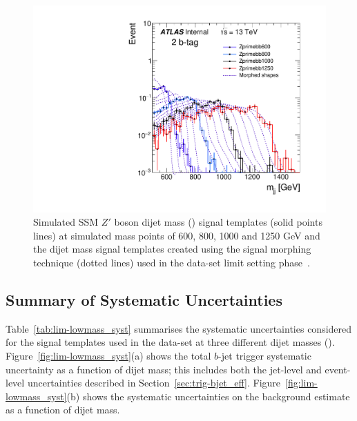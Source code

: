 \begin{figure}[!ht]
\begin{center}
  \includegraphics[width=0.5\linewidth, angle=0]{figs/Dibjet/LowMass/lim-morphing.pdf} 
\end{center}
\caption[Simulated SSM $Z'$ boson dijet mass (\mjj) signal templates and the intermediate dijet mass signal templates
  created using the signal morphing technique used in the \lm{} data-set limit setting phase.]
        {Simulated SSM $Z'$ boson dijet mass (\mjj) signal templates (solid points lines)
          at simulated mass points of 600, 800, 1000 and 1250 GeV 
          and the dijet mass signal templates created using the signal morphing technique (dotted lines) used in the \lm{} data-set limit setting phase~\cite{dibjet-full_int}.
          \label{fig:lim-full_morphing}}
\end{figure}




\subsection{Summary of Systematic Uncertainties}
\label{sec:lim-full_systs}

Table~\ref{tab:lim-lowmass_syst} summarises the systematic uncertainties considered for the
signal templates used in the \lm{} data-set at three different dijet masses (\mjj{}).
Figure~\ref{fig:lim-lowmass_syst}(a) shows the total $b$-jet trigger systematic uncertainty as a function of dijet  mass;
this includes both the jet-level and event-level uncertainties described in Section~\ref{sec:trig-bjet_eff}.
Figure~\ref{fig:lim-lowmass_syst}(b) shows the systematic uncertainties on the background estimate as a function of dijet  mass.

